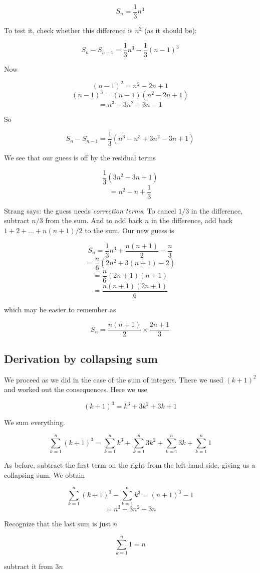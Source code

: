 \documentclass[11pt, oneside]{article}
\begin{document}
\[ S_n = \frac{1}{3} n^3 \]

To test it, check whether this difference is $n^2$ (as it should be):

\[ S_{n} - S_{n-1} = \frac{1}{3} n^3 - \frac{1}{3} (n-1)^3 \]

Now

\[ (n-1)^2 = n^2 - 2n + 1 \]
\[ (n-1)^3 = (n-1)(n^2 - 2n + 1) \]
\[ = n^3 - 3 n^2 + 3 n - 1\]

So

\[ S_{n} - S_{n-1} = \frac{1}{3} (n^3 - n^3 + 3 n^2 - 3 n + 1) \]

We see that our guess is off by the residual terms

\[ \frac{1}{3} (3 n^2 - 3 n + 1) \]
\[ = n^2 - n + \frac{1}{3} \] 

Strang says:  the guess needs \emph{correction terms}.  
To cancel $1/3$ in the difference, subtract $n/3$ from the sum.  And to add back $n$ in the difference, add back $1 + 2 + \dots + n(n+1)/2$ to the sum.  Our new guess is

\[ S_n =  \frac{1}{3} n^3 + \frac{n(n+1)}{2} - \frac{n}{3} \]
\[ = \frac{n}{6} (2n^2 + 3(n+1) - 2) \]
\[ =  \frac{n}{6} (2n + 1)(n + 1) \]
\[ = \frac{n(n+1)(2n+1)}{6} \]

which may be easier to remember as

\[ S_n = \frac{n(n+1)}{2} \times \frac{2n + 1}{3} \]

\subsection*{Derivation by collapsing sum}

We proceed as we did in the case of the sum of integers.  There we used $(k+1)^2$ and worked out the consequences.  Here we use

\[ (k+1)^3 = k^3 + 3k^2 + 3k + 1 \]

We sum everything.

\[ \sum_{k=1}^n (k+1)^3 = \sum_{k=1}^n k^3 + \sum_{k=1}^n 3k^2 + \sum_{k=1}^n 3k + \sum_{k=1}^n 1 \]

As before, subtract the first term on the right from the left-hand side, giving us a collapsing sum.  We obtain

\[ \sum_{k=1}^n (k+1)^3 - \sum_{k=1}^n k^3 = (n+1)^3 - 1 \]
\[ = n^3 + 3n^2 + 3n \]

Recognize that the last sum is just $n$ 

\[ \sum_{k=1}^n 1 = n \]

subtract it from $3n$
\end{document}
